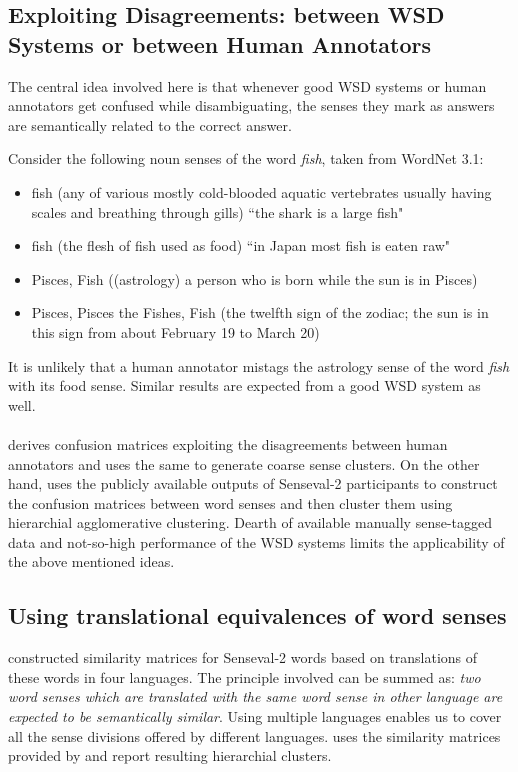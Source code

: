 \subsection{Exploiting Disagreements: between WSD Systems or between Human Annotators}
The central idea involved here is that whenever good WSD systems or human annotators get confused while disambiguating, the senses they mark as answers are semantically related to the correct answer.
\begin{example} 
\label{example:fish}
Consider the following noun senses of the word \textit{fish}, taken from WordNet 3.1:
\begin{itemize}
\item fish (any of various mostly cold-blooded aquatic vertebrates usually having scales and breathing through gills) ``the shark is a large fish"

\item fish (the flesh of fish used as food) ``in Japan most fish is eaten raw"

\item Pisces, Fish ((astrology) a person who is born while the sun is in Pisces)

\item Pisces, Pisces the Fishes, Fish (the twelfth sign of the zodiac; the sun is in this sign from about February 19 to March 20)
\end{itemize}
\end{example}

It is unlikely that a human annotator mistags the astrology sense of the word \textit{fish} with its food sense. Similar results are expected from a good WSD system as well.

\paragraph{}
\citep{chklovski2003exploiting} derives confusion matrices exploiting the disagreements between human annotators and uses the same to generate coarse sense clusters. On the other hand, \citep{agirre2003clustering} uses the publicly available outputs of Senseval-2 \citep{Edmonds:2001} participants to construct the confusion matrices between word senses and then cluster them using hierarchial agglomerative clustering. Dearth of available manually sense-tagged data and not-so-high performance of the WSD systems limits the applicability of the above mentioned ideas.

\subsection{Using translational equivalences of word senses}
\citep{chugur2002polysemy} constructed similarity matrices for Senseval-2 \citep{Edmonds:2001} words based on translations of these words in four languages. The principle involved can be summed as: \textit{two word senses which are translated with the same word sense in other language are expected to be semantically similar}. Using multiple languages enables us to cover all the sense divisions offered by different languages. \citep{agirre2003clustering} uses the similarity matrices provided by \citep{chugur2002polysemy} and report resulting hierarchial clusters.

